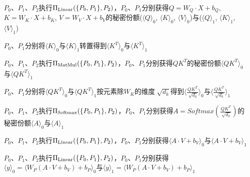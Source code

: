 \begin{algorithm}[H]
	\SetAlgoLined
	
	
	$P_0$、$P_1$、$P_2$执行$\Pi_{\rm Linear}(\{P_0, P_1\}, P_2)$，$P_0$、$P_1$分别获得$Q=W_Q\cdot X + b_Q$, $K=W_K\cdot X + b_K$, $V=W_V\cdot X + b_V$的秘密份额($\langle Q\rangle_0$, $\langle K\rangle_0$, $\langle V\rangle_0$)与($\langle Q\rangle_1$, $\langle K\rangle_1$, $\langle V\rangle_1$)
	
	$P_0$、$P_1$分别将$\langle K\rangle_0$与$\langle K\rangle_1$转置得到$\langle K^T\rangle_0$与$\langle K^T\rangle_1$
	
	$P_0$、$P_1$、$P_2$执行$\Pi_{\rm MatMul}(\{P_0, P_1\}, P_2)$，$P_0$、$P_1$分别获得$QK^T$的秘密份额$\langle QK^T\rangle_0$与$\langle QK^T\rangle_1$
	
	$P_0$、$P_1$分别将$\langle QK^T\rangle_0$与$\langle QK^T\rangle_1$按元素除$W_K$的维度$\sqrt[]{d_k}$得到$\langle\frac{ QK^T }{\sqrt[]{d_k}}\rangle_0$与$\langle\frac{ QK^T }{\sqrt[]{d_k}}\rangle_1$
	
	$P_0$、$P_1$、$P_2$执行$\Pi_{\rm Softmax}(\{P_0, P_1\}, P_2)$，$P_0$、$P_1$分别获得$A=Softmax(\frac{ QK^T }{\sqrt[]{d_k}})$的秘密份额$\langle A\rangle_0$与$\langle A\rangle_1$
	
	$P_0$、$P_1$、$P_2$执行$\Pi_{\rm Linear}(\{P_0, P_1\}, P_2)$，$P_0$、$P_1$分别获得$\langle A\cdot V + b_V\rangle_0$与$\langle A\cdot V + b_V\rangle_1$
	
	$P_0$、$P_1$、$P_2$执行$\Pi_{\rm Linear}(\{P_0, P_1\}, P_2)$，$P_0$、$P_1$分别获得$\langle y\rangle_0 = \langle W_P(A\cdot V + b_V) + b_P\rangle_0$与$\langle y\rangle_1 = \langle W_P(A\cdot V + b_V) + b_P\rangle_1$
	
	\caption{ $\Pi_{\rm Attention}(\{P_0, P_1\}, P_2)$ }
\end{algorithm}

